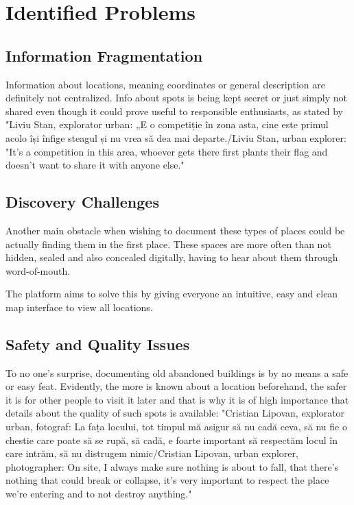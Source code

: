 \documentclass[12pt,a4paper]{report}
\begin{document}
\section{Identified Problems}
\subsection{Information Fragmentation}
Information about locations, meaning coordinates or general description are definitely not centralized. Info about spots is being kept secret or just simply not shared even though it could prove useful to responsible enthusiasts, as stated by "Liviu Stan, explorator urban: „E o competiție în zona asta, cine este primul acolo își înfige steagul și nu vrea să dea mai departe./Liviu Stan, urban explorer: "It's a competition in this area, whoever gets there first plants their flag and doesn't want to share it with anyone else."~\cite{articleUrbexInformation}

\subsection{Discovery Challenges}
Another main obstacle when wishing to document these types of places could be actually finding them in the first place. These spaces are more often than not hidden, sealed and also concealed digitally, having to hear about them through word-of-mouth.

The platform aims to solve this by giving everyone an intuitive, easy and clean map interface to view all locations.

\subsection{Safety and Quality Issues}
To no one's surprise, documenting old abandoned buildings is by no means a safe or easy feat. Evidently, the more is known about a location beforehand, the safer it is for other people to visit it later and that is why it is of high importance that details about the quality of such spots is available: "Cristian Lipovan, explorator urban, fotograf: La fața locului, tot timpul mă asigur să nu cadă ceva, să nu fie o chestie care poate să se rupă, să cadă, e foarte important să respectăm locul în care intrăm, să nu distrugem nimic/Cristian Lipovan, urban explorer, photographer: On site, I always make sure nothing is about to fall, that there's nothing that could break or collapse, it's very important to respect the place we're entering and to not destroy anything."~\cite{articleUrbexInformation}
\end{document}
